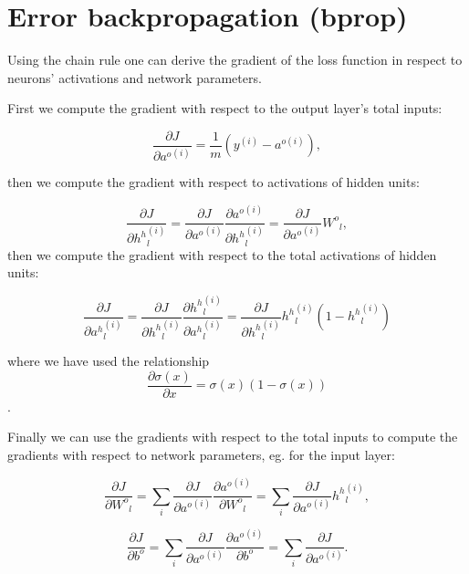 \documentclass[]{article}
\theoremstyle{definition}
\begin{document}
\section{Error backpropagation (bprop)}

Using the chain rule one can derive the gradient of the loss function
in respect to neurons' activations and network parameters.


First we compute the gradient with respect to the output layer's
total inputs:

\begin{equation}
\frac{\partial J}{\partial {a^o}^{(i)}} = \frac{1}{m} \left( y^{(i)}- a^{o{(i)}}  \right),
\end{equation}

then we compute the gradient with respect to activations of hidden units:

\begin{equation}
\frac{\partial J}{\partial {h^h}^{(i)}_l} = \frac{\partial J}{\partial {a^o}^{(i)}} \frac{\partial {a^o}^{(i)}}{\partial {h^h}^{(i)}_l} =  \frac{\partial J}{\partial {a^o}^{(i)}} {W^o}_{l},
\end{equation}
then we compute the gradient with respect to the total activations of hidden units:

\begin{equation}
\frac{\partial J}{\partial {a^h}^{(i)}_l} = \frac{\partial J}{\partial {h^h}^{(i)}_l}\frac{\partial {h^h}^{(i)}_l}{\partial {a^h}^{(i)}_l} = \frac{\partial J}{\partial {h^h}^{(i)}_l} {h^h}^{(i)}_l(1-{h^h}^{(i)}_l) 
\end{equation}

where we have used the relationship
$$\frac{\partial \sigma(x)}{\partial x} = \sigma(x)(1-\sigma(x))$$	.


Finally we can use the gradients with respect to the total inputs to
compute the gradients with respect to network parameters,
eg. for the input layer:

\begin{equation}
\frac{\partial J}{\partial {W^o}_{l}} = \sum_{i}\frac{\partial J}{\partial {a^o}^{(i)}}\frac{\partial {a^o}^{(i)}}{\partial {W^o}_{l}} = \sum_{i}\frac{\partial J}{\partial {a^o}^{(i)}}{h^h}^{(i)}_l,
\end{equation}

\begin{equation}
\frac{\partial J}{\partial {b^o}} = \sum_{i}\frac{\partial J}{\partial {a^o}^{(i)}}\frac{\partial {a^o}^{(i)}}{\partial {b^o}} = \sum_{i}\frac{\partial J}{\partial {a^o}^{(i)}}.
\end{equation}
\end{document}
